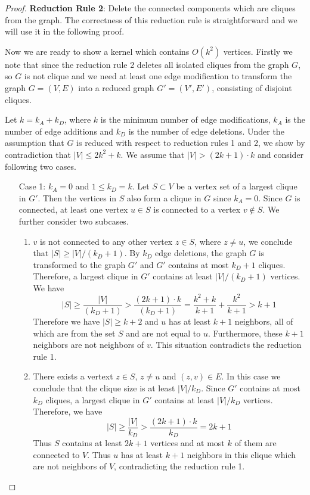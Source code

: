 \documentclass{article}
\begin{document}
\begin{proof}
\noindent \textbf{Reduction Rule 2}: Delete the connected components which are cliques from the graph. The correctness of this reduction rule is straightforward and we will use it in the following proof.

Now we are ready to show a kernel which contains \(O(k^2)\) vertices. Firstly we note that since the reduction rule 2 deletes all isolated cliques from the graph \(G\), so \(G\) is not clique and we need at least one edge modification to transform the graph \(G = (V,E)\) into a reduced graph \(G'=(V',E')\), consisting of disjoint cliques.

Let \(k = k_A + k_D\), where \(k\) is the minimum number of edge modifications, \(k_A\) is the number of edge additions and \(k_D\) is the number of edge deletions. Under the assumption that \(G\) is reduced with respect to reduction rules 1 and 2, we show by contradiction that \(|V| \leq 2k^2+k\). We assume that \(|V| > (2k+1)\cdot k\) and consider following two cases.

\begin{enumerate}
\item[Case 1:] \(k_A=0\) and \(1 \leq k_D=k\). Let \(S \subset V\) be a vertex set of a largest clique in \(G'\). Then the vertices in \(S\) also form a clique in \(G\) since \(k_A=0\). Since \(G\) is connected, at least one vertex \(u \in S\) is connected to a vertex \(v \notin S\). We further consider two subcases.
    \begin{enumerate}
    \item \(v\) is not connected to any other vertex \(z \in S\), where \(z \neq u\), we conclude that \(|S| \geq |V|/(k_D+1)\). By \(k_D\) edge deletions, the graph \(G\) is transformed to the graph \(G'\) and \(G'\) contains at most \(k_D+1\) cliques. Therefore, a largest clique in \(G'\) contains at least \(|V|/(k_D+1)\) vertices. 
        We have $$|S| \geq \frac{|V|}{(k_D+1)} > \frac{(2k+1)\cdot k}{(k_D+1)} = \frac{k^2+k}{k+1}+\frac{k^2}{k+1} > k+1$$ Therefore we have \(|S| \geq k+2\) and \(u\) has at least \(k+1\) neighbors, all of which are from the set \(S\) and are not equal to \(u\). Furthermore, these \(k+1\) neighbors are not neighbors of \(v\). This situation contradicts the reduction rule 1.
    \item There exists a vertext \(z \in S\), \(z \neq u\) and \((z,v) \in E\). In this case we conclude that the clique size is at least \(|V|/k_D\). Since \(G'\) contains at most \(k_D\) cliques, a largest clique in \(G'\) contains at least \(|V|/k_D\) vertices. Therefore, we have $$|S| \geq \frac{|V|}{k_D}>\frac{(2k+1)\cdot k}{k_D}=2k+1$$ Thus \(S\) contains at least \(2k+1\) vertices and at most \(k\) of them are connected to \(V\). Thus \(u\) has at least \(k+1\) neighbors in this clique which are not neighbors of \(V\), contradicting the reduction rule 1.
    \end{enumerate}


\end{enumerate}
\end{proof}
\end{document}
